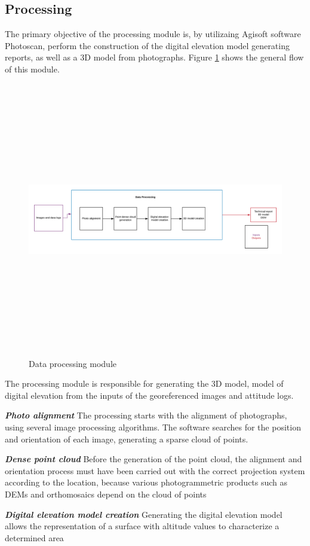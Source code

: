 \subsection{Processing}
The primary objective of the processing module is, by utilizaing Agisoft software Photoscan, perform the construction of the digital elevation model generating reports, as well as a 3D model from photographs. Figure \ref{fig:DataProcessing} shows the general flow of this module.
\begin{figure}[H]
\centering
\includegraphics[width=12cm,height=12cm,keepaspectratio]{imagenes/DataProcessing.png}
\caption{Data processing module}
\label{fig:DataProcessing}
\end{figure}
The processing module is responsible for generating the 3D model, model of digital elevation from the inputs of the  georeferenced images and  attitude logs.

\textit{\textbf{Photo alignment}} \newline
The processing starts with the alignment of photographs, using several image processing algorithms. The software searches for the position and orientation of each image, generating a sparse cloud of points.

\textit{\textbf{Dense point cloud}} \newline
Before the generation of the point cloud, the alignment and orientation process must have been carried out with the correct projection system according to the location, because various photogrammetric products such as DEMs and orthomosaics depend on the cloud of points 

\textit{\textbf{Digital elevation model creation}} \newline
Generating the digital elevation model allows the representation of a surface with altitude values to characterize a determined area

